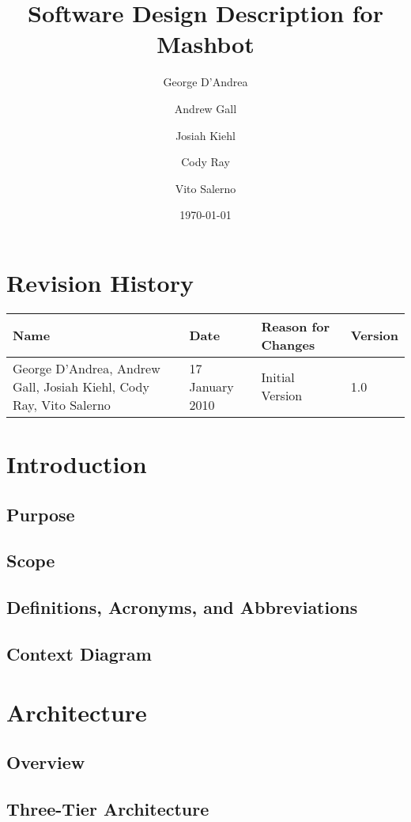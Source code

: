 \documentclass{article}
\begin{document}
\title{Software Design Description for Mashbot} 
\author{George D'Andrea \and Andrew Gall \and Josiah Kiehl \and
  Cody Ray \and Vito Salerno}
\date{\today}
\begin{titlepage}
\maketitle
\end{titlepage}

\section*{Revision History}
\begin{tabular}{|p{2in}|l|l|l|}
  \hline
  \textbf{Name} & \textbf{Date} & \textbf{Reason for Changes} & \textbf{Version} \\
  \hline \hline
  George D'Andrea, Andrew Gall, Josiah Kiehl, Cody Ray, Vito
  Salerno & 17 January 2010 & Initial Version & 1.0 \\
  \hline
\end{tabular}

\clearpage
\tableofcontents
\clearpage

\section{Introduction}
\subsection{Purpose}
\subsection{Scope}
\subsection{Definitions, Acronyms,   and Abbreviations}
\subsection{Context Diagram}
\section{Architecture}
\subsection{Overview}
\subsection{Three-Tier Architecture}
\end{document}

